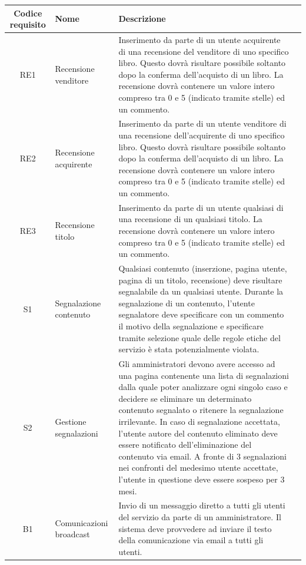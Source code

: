 \documentclass[10pt,a4paper]{report}
\begin{document}
	\begin{tabular}{cp{3cm}p{9cm}p{1cm}}
		Codice requisito&Nome&Descrizione\\ \hline
		RE1&Recensione venditore&Inserimento da parte di un utente acquirente di una recensione del venditore di uno specifico libro. Questo dovrà risultare possibile soltanto dopo la conferma dell'acquisto di un libro. La recensione dovrà contenere un valore intero compreso tra 0 e 5 (indicato tramite stelle) ed un commento.\\ \hline
		RE2&Recensione acquirente&Inserimento da parte di un utente venditore di una recensione dell'acquirente di uno specifico libro. Questo dovrà risultare possibile soltanto dopo la conferma dell'acquisto di un libro. La recensione dovrà contenere un valore intero compreso tra 0 e 5 (indicato tramite stelle) ed un commento.\\ \hline
		RE3&Recensione titolo&Inserimento da parte di un utente qualsiasi di una recensione di un qualsiasi titolo. La recensione dovrà contenere un valore intero compreso tra 0 e 5 (indicato tramite stelle) ed un commento.\\ \hline
		S1&Segnalazione contenuto&Qualsiasi contenuto (inserzione, pagina utente, pagina di un titolo, recensione) deve risultare segnalabile da un qualsiasi utente. Durante la segnalazione di un contenuto, l'utente segnalatore deve specificare con un commento il motivo della segnalazione e specificare tramite selezione quale delle regole etiche del servizio è stata potenzialmente violata.\\ \hline
		S2&Gestione segnalazioni&Gli amministratori devono avere accesso ad una pagina contenente una lista di segnalazioni dalla quale poter analizzare ogni singolo caso e decidere se eliminare un determinato contenuto segnalato o ritenere la segnalazione irrilevante. In caso di segnalazione accettata, l'utente autore del contenuto eliminato deve essere notificato dell'eliminazione del contenuto via email. A fronte di 3 segnalazioni nei confronti del medesimo utente accettate, l'utente in questione deve essere sospeso per 3 mesi.\\ \hline
		B1&Comunicazioni broadcast&Invio di un messaggio diretto a tutti gli utenti del servizio da parte di un amministratore. Il sistema deve provvedere ad inviare il testo della comunicazione via email a tutti gli utenti.\\ \hline
	\end{tabular}
\end{document}

